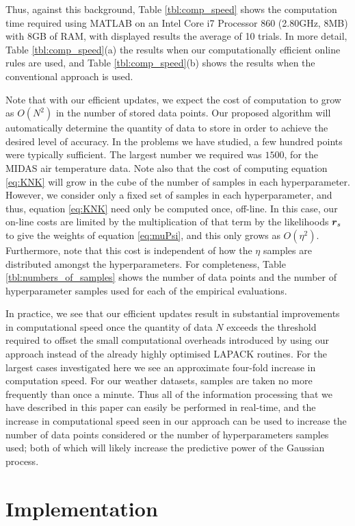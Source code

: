 \documentclass{acmtrans2m}
\begin{document}
Thus, against this background, Table \ref{tbl:comp_speed} shows the computation time required using MATLAB on an Intel Core i7 Processor 860 (2.80GHz, 8MB) with 8GB of RAM, with displayed results the average of 10 trials. In more detail, Table \ref{tbl:comp_speed}(a) the results when our computationally efficient online rules are used, and Table \ref{tbl:comp_speed}(b) shows the results when the conventional approach is used.

Note that with our efficient updates, we expect the cost of computation to grow as $O(N^2)$ in the number of stored data points. Our proposed algorithm will automatically determine the quantity of data to store in order to achieve the desired level of accuracy. In the problems we have studied, a few hundred points were typically sufficient. The largest number we required was $1500$, for the MIDAS air temperature data. Note also that the cost of computing equation \eqref{eq:KNK} will grow in the cube of the number of samples in each hyperparameter. However, we consider only a fixed set of samples in each hyperparameter, and thus, equation \eqref{eq:KNK} need only be computed once, off-line. In this case, our on-line costs are limited by the multiplication of that term by the likelihoods $\boldsymbol{r}_s$ to give the weights of equation \eqref{eq:muPsi}, and this only grows as $O(\eta^2)$. Furthermore, note that this cost is independent of how the $\eta$ samples are distributed amongst the hyperparameters. For completeness, Table \ref{tbl:numbers_of_samples} shows the number of data points and the number of hyperparameter samples used for each of the empirical evaluations.


In practice, we see that our efficient updates result in substantial improvements in computational speed once the quantity of data $N$ exceeds the threshold required to offset the small computational overheads introduced by using our approach instead of the already highly optimised LAPACK routines. For the largest cases investigated here we see an approximate four-fold increase in computation speed. For our weather datasets, samples are taken no more frequently than once a minute. Thus all of the information processing that we have described in this paper can easily be performed in real-time, and the increase in computational speed seen in our approach can be used to increase the number of data points considered or the number of hyperparameters samples used; both of which will likely increase the predictive power of the Gaussian process.

\section{Implementation}\label{sec_implementation}
\end{document}
